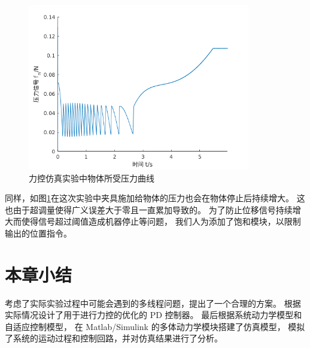 \begin{figure}[!ht]
  \centering
  \includegraphics[width=9.7cm]{chapter04/pic/fn_x}
  \caption{\label{fig:fn_x}
    力控仿真实验中物体所受压力曲线}
  \vspace{-0.3cm}
\end{figure}


同样，如图\ref{fig:fn_x}在这次实验中夹具施加给物体的压力也会在物体停止后持续增大。
这也由于超调量使得广义误差大于零且一直累加导致的。
为了防止位移信号持续增大而使得信号超过阈值造成机器停止等问题，
我们人为添加了饱和模块，以限制输出的位置指令。

\section{本章小结}
考虑了实际实验过程中可能会遇到的多线程问题，提出了一个合理的方案。
根据实际情况设计了用于进行力控的优化的 PD 控制器。
最后根据系统动力学模型和自适应控制模型，
在 Matlab/Simulink 的多体动力学模块搭建了仿真模型，
模拟了系统的运动过程和控制回路，并对仿真结果进行了分析。

